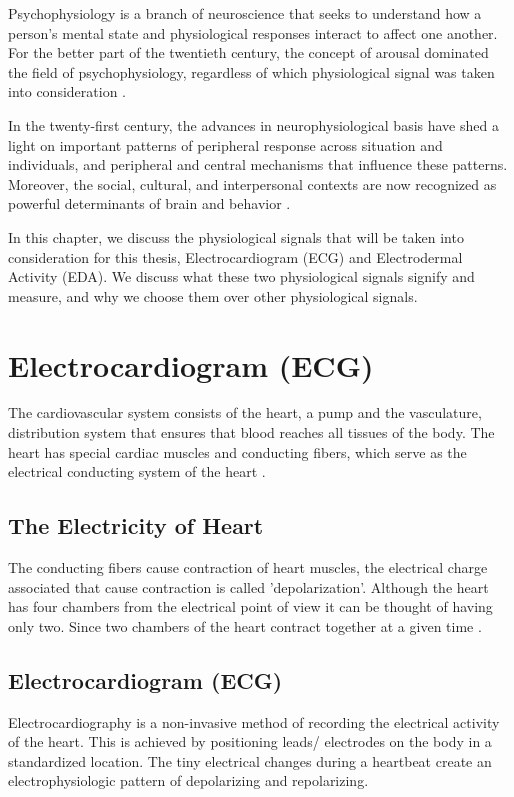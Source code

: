\label{chapter:terminology}
Psychophysiology is a branch of neuroscience that seeks to understand how a person’s mental state and physiological responses interact to affect one another. For the better part of the twentieth century, the concept of arousal dominated the field of psychophysiology, regardless of which physiological signal was taken into consideration \cite{cacioppo_strong_2016_p_3_15}.

In the twenty-first century, the advances in neurophysiological basis have shed a light on important patterns of peripheral response across situation and individuals, and peripheral and central mechanisms that influence these patterns. Moreover, the social, cultural, and interpersonal contexts are now recognized as powerful determinants of brain and behavior \cite{cacioppo_strong_2016_p_3_15}.

In this chapter, we discuss the physiological signals that will be taken into consideration for this thesis, Electrocardiogram (ECG) and Electrodermal Activity (EDA). We discuss what these two physiological signals signify and measure, and why we choose them over other physiological signals.

\section{Electrocardiogram (ECG)}
The cardiovascular system consists of the heart, a pump and the vasculature, distribution system that ensures that blood reaches all tissues of the body. The heart has special cardiac muscles and conducting fibers, which serve as the electrical conducting system of the heart \cite{cacioppo_cardiovascular_2016_p_183_216}.

\subsection{The Electricity of Heart} The conducting fibers cause contraction of heart muscles, the electrical charge associated that cause contraction is called 'depolarization'. Although the heart has four chambers from the electrical point of view it can be thought of having only two. Since two chambers of the heart contract together at a given time \cite{hampton_ecg_2013}.

\subsection{Electrocardiogram (ECG)} Electrocardiography is a non-invasive method of recording the electrical activity of the heart. This is achieved by positioning leads/ electrodes on the body in a standardized location. The tiny electrical changes during a heartbeat create an electrophysiologic pattern of depolarizing and repolarizing.
